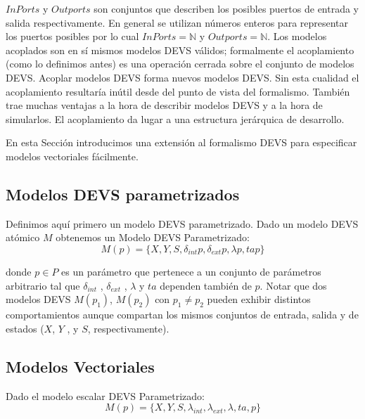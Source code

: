 \documentclass[a4paper,	11pt]{report}
\begin{document}
$InPorts$ y $Outports$ son conjuntos que describen los posibles puertos de entrada y salida respectivamente. En general se utilizan números enteros para representar los puertos posibles por lo cual $InPorts = \mathbb{N}$ y $Outports = \mathbb{N}$. Los modelos acoplados son en sí mismos modelos DEVS válidos; formalmente el acoplamiento (como lo definimos antes) es una operación cerrada sobre el conjunto de modelos DEVS. Acoplar modelos DEVS forma nuevos modelos DEVS. Sin esta cualidad el acoplamiento resultaría inútil desde del punto de vista del formalismo. También trae muchas ventajas a la hora de describir modelos DEVS y a la hora de simularlos. El acoplamiento da lugar a una estructura jerárquica de desarrollo.

En esta Sección introducimos una extensión al formalismo DEVS para especificar modelos vectoriales fácilmente.

\subsection{Modelos DEVS parametrizados}
Definimos aquí primero un modelo DEVS parametrizado. Dado un modelo DEVS atómico $M$ obtenemos un Modelo DEVS Parametrizado:
\begin{equation}
M (p) = \{X, Y, S, \delta_{int} p , \delta_{ext} p ,\lambda p , ta p\}
\end{equation}

donde $p \in P$ es un parámetro que pertenece a un conjunto de parámetros arbitrario tal que $\delta_{int}$ , $\delta_{ext}$ , $\lambda$ y $ta$ dependen también de $p$.
Notar que dos modelos DEVS $M (p_1 )$, $M (p_2 )$ con $p_1 \neq p_2$ pueden exhibir distintos comportamientos aunque compartan los mismos conjuntos de entrada, salida y de estados ($X$, $Y$ , y $S$, respectivamente).

\subsection{Modelos Vectoriales}
Dado el modelo escalar DEVS Parametrizado:
\begin{equation}
M (p) = \{X, Y, S, \lambda_{int} , \lambda_{ext} , \lambda, ta, p\}
\end{equation}
\end{document}
